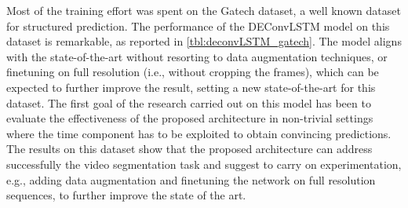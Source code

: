 


Most of the training effort was spent on the Gatech dataset, a well known
dataset for structured prediction. The performance of the DEConvLSTM model on
this dataset is remarkable, as reported in \autoref{tbl:deconvLSTM_gatech}. The
model aligns with the state-of-the-art without resorting to data augmentation
techniques, or finetuning on full resolution (i.e., without cropping the
frames), which can be expected to further improve the result, setting a new
state-of-the-art for this dataset. The first goal of the research carried out
on this model has been to evaluate the effectiveness of the proposed
architecture in non-trivial settings where the time component has to be
exploited to obtain convincing predictions. The results on this dataset show
that the proposed architecture can address successfully the video segmentation
task and suggest to carry on experimentation, e.g., adding data augmentation
and finetuning the network on full resolution sequences, to further improve the
state of the art.

\begin{table}[t]
    \caption{Results on the Gatech dataset. Pixel accuracy is reported (higher
        is better). IoU is not reported as customary in the literature for this
        dataset.}
    \label{tbl:deconvLSTM_gatech}
\end{table}


